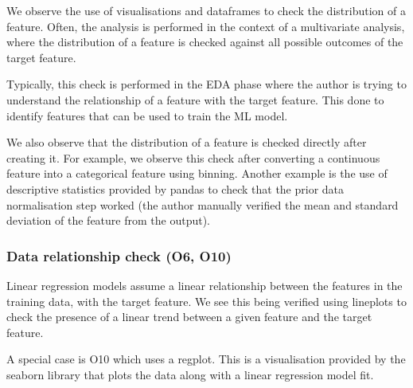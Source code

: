 

We observe the use of visualisations and dataframes to check the distribution of a feature. Often, the analysis is performed in the context of a multivariate analysis, where the distribution of a feature is checked against all possible outcomes of the target feature.

Typically, this check is performed in the EDA phase where the author is trying to understand the relationship of a feature with the target feature. This done to identify features that can be used to train the ML model.

We also observe that the distribution of a feature is checked directly after creating it. For example, we observe this check after converting a continuous feature into a categorical feature using binning. Another example is the use of descriptive statistics provided by pandas to check that the prior data normalisation step worked (the author manually verified the mean and standard deviation of the feature from the output).

\subsubsection{Data relationship check (O6, O10)}

Linear regression models assume a linear relationship between the features in the training data, with the target feature. We see this being verified using lineplots to check the presence of a linear trend between a given feature and the target feature.

A special case is O10 which uses a regplot. This is a visualisation provided by the seaborn library that plots the data along with a linear regression model fit.

